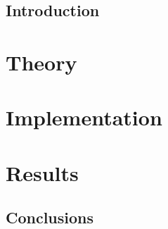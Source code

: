 \documentclass[11pt,a4paper]{book}
\numberwithin{equation}{section}
\begin{document}
 

\cleardoublepage

\doublespacing
\tableofcontents
\singlespacing
 
\chapter{Introduction}

 

\part{Theory} 

 
\part{Implementation}


\part{Results}


\chapter{Conclusions}\label{sec: Conclusions}




\begin{changemargin}{0 cm}{4 cm}

\end{changemargin}
 
\end{document}

